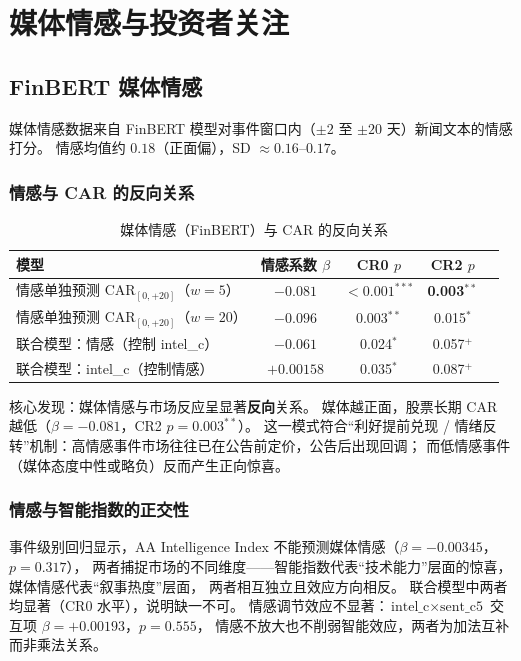 \documentclass[11pt,fontset=fandol,a4paper]{ctexart}
\begin{document}
\section{媒体情感与投资者关注}

\subsection{FinBERT 媒体情感}

媒体情感数据来自 FinBERT 模型对事件窗口内（$\pm2$ 至 $\pm20$ 天）新闻文本的情感打分。
情感均值约 $0.18$（正面偏），SD $\approx 0.16$--$0.17$。

\subsubsection{情感与 CAR 的反向关系}

\begin{table}[htbp]
\centering
\caption{媒体情感（FinBERT）与 CAR 的反向关系}
\label{tab:sentiment}
\small
\begin{tabular}{lcccc}
\toprule
模型 & 情感系数 $\beta$ & CR0 $p$ & CR2 $p$ \\
\midrule
情感单独预测 $\text{CAR}_{[0,+20]}$（$w=5$） & \textbf{$-0.081$} & \textbf{$<0.001^{***}$} & \textbf{0.003$^{**}$} \\
情感单独预测 $\text{CAR}_{[0,+20]}$（$w=20$） & $-0.096$ & 0.003$^{**}$ & 0.015$^{*}$ \\
联合模型：情感（控制 intel\_c）& $-0.061$ & 0.024$^{*}$ & 0.057$^{+}$ \\
联合模型：intel\_c（控制情感）& $+0.00158$ & 0.035$^{*}$ & 0.087$^{+}$ \\
\bottomrule
\end{tabular}
\end{table}

核心发现：媒体情感与市场反应呈显著\textbf{反向}关系。
媒体越正面，股票长期 CAR 越低（$\beta=-0.081$，CR2 $p=0.003^{**}$）。
这一模式符合``利好提前兑现 / 情绪反转''机制：高情感事件市场往往已在公告前定价，公告后出现回调；
而低情感事件（媒体态度中性或略负）反而产生正向惊喜。

\subsubsection{情感与智能指数的正交性}

事件级别回归显示，AA Intelligence Index 不能预测媒体情感（$\beta=-0.00345$，$p=0.317$），
两者捕捉市场的不同维度——智能指数代表``技术能力''层面的惊喜，媒体情感代表``叙事热度''层面，
两者相互独立且效应方向相反。
联合模型中两者均显著（CR0 水平），说明缺一不可。
情感调节效应不显著：$\text{intel\_c}\times\text{sent\_c5}$ 交互项 $\beta=+0.00193$，$p=0.555$，
情感不放大也不削弱智能效应，两者为加法互补而非乘法关系。
\end{document}
